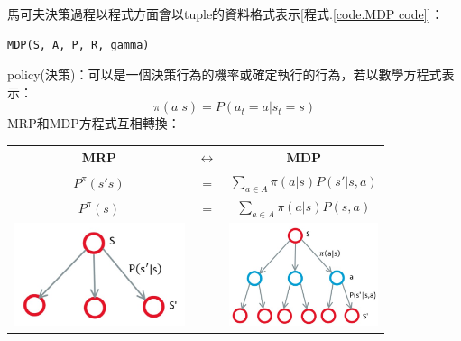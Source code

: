 \documentclass[14pt,a4paper]{report}  %
\begin{document}
馬可夫決策過程以程式方面會以tuple的資料格式表示[程式.\ref{code.MDP code}]：
\label{code.MDP code}
\begin{lstlisting}
MDP(S, A, P, R, gamma)
\end{lstlisting}


policy(決策)：可以是一個決策行為的機率或確定執行的行為，若以數學方程式表示：
$$\pi (a|s) = P(a_t=a|s_t=s)$$
MRP和MDP方程式互相轉換：\\
\begin{center}
\begin{tabular}[c]{ccc}    
MRP & $\longleftrightarrow$ & MDP\\
\hline
$P^{\pi}(s's)$ & = & $\sum_{a\in A}\pi (a|s)P(s'|s, a)$\\
$P^{\pi}(s)$ & = & $\sum_{a\in A}\pi (a|s)P(s, a)$\\
\includegraphics[height=3cm]{MRP}&&\includegraphics[height=3cm]{MDP}\\
\hline
\end{tabular}
\end{center}
\end{document}
